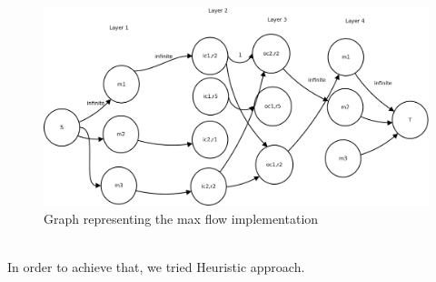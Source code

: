 \begin{figure}[h]
  \centering
  \includegraphics[scale=0.23]{figures/maxflow.png}
  \caption[Max Flow]{Graph representing the max flow implementation}\label{fig:maxflow}
\end{figure}
\\
In order to achieve that, we tried Heuristic approach.
